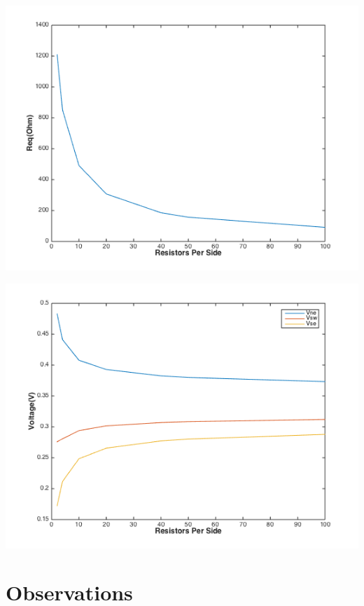 \documentclass[12pt,a4paper]{article}
\begin{document}
	
\includegraphics[scale =0.75 ]{./req_resis.png}

\includegraphics[scale =0.75 ]{./volt_resis.png}
	





\section{Observations}
\end{document}
